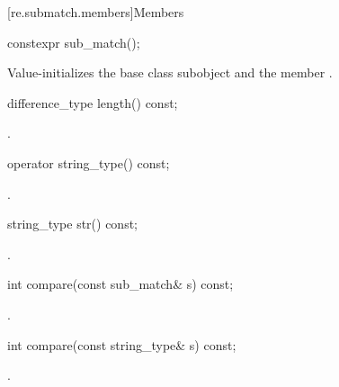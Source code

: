 [re.submatch.members]{Members}

%
\begin{itemdecl}
constexpr sub_match();
\end{itemdecl}

\begin{itemdescr}
\pnum
\effects
Value-initializes the  base class subobject and the member
.
\end{itemdescr}

%
\begin{itemdecl}
difference_type length() const;
\end{itemdecl}

\begin{itemdescr}
\pnum
\returns
{}.
\end{itemdescr}

%
\begin{itemdecl}
operator string_type() const;
\end{itemdecl}

\begin{itemdescr}
\pnum
\returns
{}.
\end{itemdescr}

%
\begin{itemdecl}
string_type str() const;
\end{itemdecl}

\begin{itemdescr}
\pnum
\returns
{}.
\end{itemdescr}

%
\begin{itemdecl}
int compare(const sub_match& s) const;
\end{itemdecl}

\begin{itemdescr}
\pnum
\returns
{}.
\end{itemdescr}

%
\begin{itemdecl}
int compare(const string_type& s) const;
\end{itemdecl}

\begin{itemdescr}
\pnum
\returns
{}.
\end{itemdescr}

